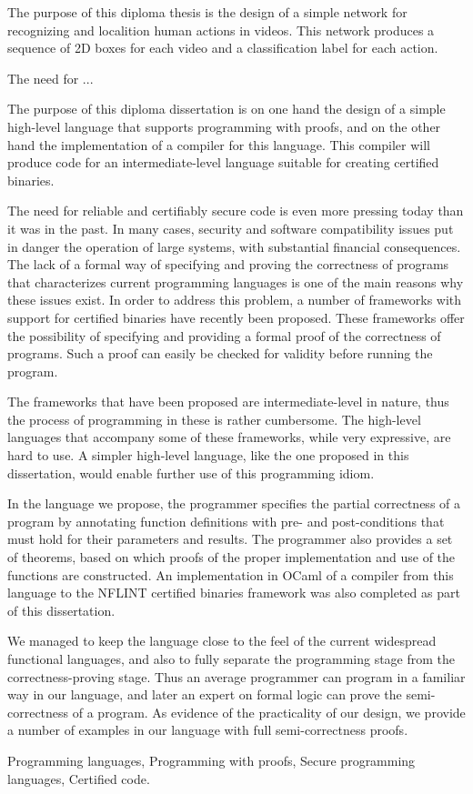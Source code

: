 \documentclass[diploma]{softlab-thesis}
\begin{document}
\begin{abstracten}%
  The purpose of this diploma thesis is the design of a simple
  network for recognizing and localition human actions in videos.
  This network produces a sequence of 2D boxes for each video and
  a classification label for each action. 

  The need for ...

  
  The purpose of this diploma dissertation is on one hand the design
  of a simple high-level language that supports programming with
  proofs, and on the other hand the implementation of a compiler for
  this language. This compiler will produce code for an
  intermediate-level language suitable for creating certified
  binaries.

  The need for reliable and certifiably secure code is even more
  pressing today than it was in the past. In many cases, security and
  software compatibility issues put in danger the operation of large
  systems, with substantial financial consequences. The lack of a
  formal way of specifying and proving the correctness of programs that
  characterizes current programming languages is one of the main reasons
  why these issues exist. In order to address this problem, a number of
  frameworks with support for certified binaries have recently been
  proposed. These frameworks offer the possibility of specifying and
  providing a formal proof of the correctness of programs. Such a proof
  can easily be checked for validity before running the program.

  The frameworks that have been proposed are intermediate-level in
  nature, thus the process of programming in these is rather cumbersome.
  The high-level languages that accompany some of these frameworks,
  while very expressive, are hard to use. A simpler high-level language,
  like the one proposed in this dissertation, would enable further use
  of this programming idiom.

  In the language we propose, the programmer specifies the partial
  correctness of a program by annotating function definitions with pre-
  and post-conditions that must hold for their parameters and results.
  The programmer also provides a set of theorems, based on which proofs
  of the proper implementation and use of the functions are constructed.
  An implementation in OCaml of a compiler from this language to the
  NFLINT certified binaries framework was also completed as part of this
  dissertation.

  We managed to keep the language close to the feel of the current
  widespread functional languages, and also to fully separate the
  programming stage from the correctness-proving stage. Thus an average
  programmer can program in a familiar way in our language, and later an
  expert on formal logic can prove the semi-correctness of a program.
  As evidence of the practicality of our design, we provide a number of
  examples in our language with full semi-correctness proofs.
\begin{keywordsen}
Programming languages, Programming with proofs, Secure programming
languages, Certified code.
\end{keywordsen}
\end{abstracten}
\end{document}
